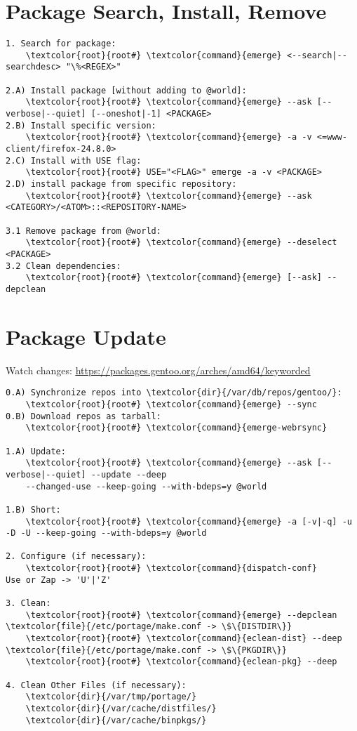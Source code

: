 \documentclass[10pt, a4paper, onecolumn, openany]{book}         %
\begin{document}
\section{Package Search, Install, Remove}
\begin{Verbatim}[commandchars=\\\{\}]
1. Search for package:
    \textcolor{root}{root#} \textcolor{command}{emerge} <--search|--searchdesc> "\%<REGEX>"
    
2.A) Install package [without adding to @world]:
    \textcolor{root}{root#} \textcolor{command}{emerge} --ask [--verbose|--quiet] [--oneshot|-1] <PACKAGE>
2.B) Install specific version:
    \textcolor{root}{root#} \textcolor{command}{emerge} -a -v <=www-client/firefox-24.8.0>
2.C) Install with USE flag:
    \textcolor{root}{root#} USE="<FLAG>" emerge -a -v <PACKAGE>
2.D) install package from specific repository:
    \textcolor{root}{root#} \textcolor{command}{emerge} --ask <CATEGORY>/<ATOM>::<REPOSITORY-NAME>
    
3.1 Remove package from @world:
    \textcolor{root}{root#} \textcolor{command}{emerge} --deselect <PACKAGE>
3.2 Clean dependencies:
    \textcolor{root}{root#} \textcolor{command}{emerge} [--ask] --depclean
\end{Verbatim}

\section{Package Update}
\label{package-update}
Watch changes: \underline{\url{https://packages.gentoo.org/arches/amd64/keyworded}}
\begin{Verbatim}[commandchars=\\\{\}]
0.A) Synchronize repos into \textcolor{dir}{/var/db/repos/gentoo/}:
    \textcolor{root}{root#} \textcolor{command}{emerge} --sync
0.B) Download repos as tarball:
    \textcolor{root}{root#} \textcolor{command}{emerge-webrsync}

1.A) Update:
    \textcolor{root}{root#} \textcolor{command}{emerge} --ask [--verbose|--quiet] --update --deep
    --changed-use --keep-going --with-bdeps=y @world

1.B) Short:
    \textcolor{root}{root#} \textcolor{command}{emerge} -a [-v|-q] -u -D -U --keep-going --with-bdeps=y @world

2. Configure (if necessary):
    \textcolor{root}{root#} \textcolor{command}{dispatch-conf}
Use or Zap -> 'U'|'Z'

3. Clean:
    \textcolor{root}{root#} \textcolor{command}{emerge} --depclean
\textcolor{file}{/etc/portage/make.conf -> \$\{DISTDIR\}}
    \textcolor{root}{root#} \textcolor{command}{eclean-dist} --deep
\textcolor{file}{/etc/portage/make.conf -> \$\{PKGDIR\}}
    \textcolor{root}{root#} \textcolor{command}{eclean-pkg} --deep

4. Clean Other Files (if necessary):
    \textcolor{dir}{/var/tmp/portage/}
    \textcolor{dir}{/var/cache/distfiles/}
    \textcolor{dir}{/var/cache/binpkgs/}
\end{Verbatim}
\end{document}

